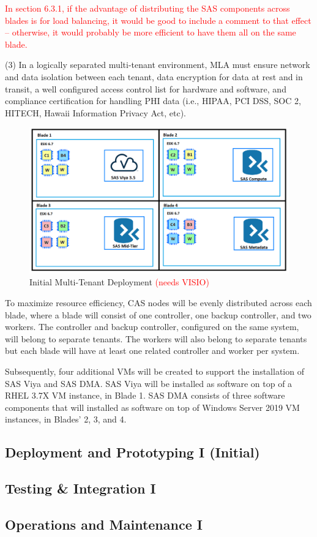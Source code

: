 \textcolor{red}{In section 6.3.1, if the advantage of distributing the SAS components
across blades is for load balancing, it would be good to include a
comment to that effect -- otherwise, it would probably be more efficient
to have them all on the same blade.}

(3) In a logically separated multi-tenant environment, MLA must ensure network and data isolation between each tenant, data encryption for data at rest and in transit, a well configured access control list for hardware and software, and compliance certification for handling PHI data (i.e., HIPAA, PCI DSS, SOC 2, HITECH, Hawaii Information Privacy Act, etc). 

\begin{figure}[H]
    \centering
    \includegraphics[scale = 0.52]{images/initial-deployment-diagram.png}
    \caption{Initial Multi-Tenant Deployment \textcolor{red}{(needs VISIO)} }
    \label{Initial Multi-Tenant Deployment}
\end{figure} 

To maximize resource efficiency, CAS nodes will be evenly distributed across each blade, where a blade will consist of one controller, one backup controller, and two workers. The controller and backup controller, configured on the same system, will belong to separate tenants. The workers will also belong to separate tenants but each blade will have at least one related controller and worker per system. 

Subsequently, four additional VMs will be created to support the installation of SAS Viya and SAS DMA. SAS Viya will be installed as software on top of a RHEL 3.7X VM instance, in Blade 1. SAS DMA consists of three software components that will installed as software on top of Windows Server 2019 VM instances, in Blades' 2, 3, and 4. 

\subsection{Deployment and Prototyping I (Initial)}

\subsection{Testing \& Integration I}

\subsection{Operations and Maintenance I}